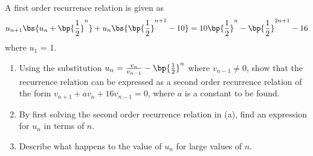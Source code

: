 \begin{problem}
    A first order recurrence relation is given as \[u_{n+1} \bs{u_n + \bp{\frac12}^n} + u_n \bs{\bp{\frac12}^{n+1} - 10} = 10\bp{\frac12}^n - \bp{\frac12}^{2n+1} - 16\] where $u_1$ = 1.

    \begin{enumerate}
        \item Using the substitution $u_n = \frac{v_n}{v_{n-1}} - \bp{\frac12}^n$ where $v_{n-1} \neq 0$, show that the recurrence relation can be expressed as a second order recurrence relation of the form $v_{n+1} + av_n + 16v_{n-1} = 0$, where $a$ is a constant to be found.
        \item By first solving the second order recurrence relation in (a), find an expression for $u_n$ in terms of $n$.
        \item Describe what happens to the value of $u_n$ for large values of $n$.
    \end{enumerate}
\end{problem}
\clearpage
